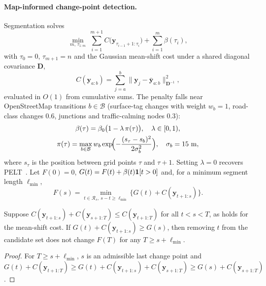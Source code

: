 \paragraph{Map-informed change-point detection.}
Segmentation solves
\begin{equation}
\min_{m,\,\tau_{1:m}}\ \sum_{i=1}^{m+1}C\bigl(\mathbf y_{\tau_{i-1}+1:\tau_i}\bigr)+\sum_{i=1}^{m}\beta(\tau_i),
\label{eq:pelt}
\end{equation}
with $\tau_0=0$, $\tau_{m+1}=n$ and the Gaussian mean-shift cost under a shared diagonal covariance $\mathbf D$,
\begin{equation}
C(\mathbf y_{a:b})=\sum_{j=a}^{b}\lVert\mathbf y_j-\bar{\mathbf y}_{a:b}\rVert^2_{\mathbf D^{-1}},
\end{equation}
evaluated in $O(1)$ from cumulative sums.
The penalty falls near OpenStreetMap transitions $b\in\mathcal B$ (surface-tag changes with weight $w_b=1$, road-class changes $0.6$, junctions and traffic-calming nodes $0.3$):
\begin{gather}
\beta(\tau)=\beta_0\bigl(1-\lambda\,\pi(\tau)\bigr),\quad \lambda\in[0,1),\\
\pi(\tau)=\max_{b\in\mathcal B}w_b\exp\!\Bigl(-\frac{(s_\tau-s_b)^2}{2\sigma_b^2}\Bigr),\quad \sigma_b=15~\mathrm m,
\end{gather}
where $s_\tau$ is the position between grid points $\tau$ and $\tau+1$.
Setting $\lambda=0$ recovers PELT~\cite{killick2012pelt}.
Let $F(0)=0$, $G(t)=F(t)+\beta(t)\mathbf{1}[t>0]$ and, for a minimum segment length $\ell_{\min}$,
\begin{equation}
F(s)=\min_{t\in\mathcal R_s,\ s-t\ge\ell_{\min}}\bigl\{G(t)+C(\mathbf y_{t+1:s})\bigr\}.
\end{equation}

\begin{lemma}
\label{lem:prune}
Suppose $C(\mathbf y_{t+1:s})+C(\mathbf y_{s+1:T})\le C(\mathbf y_{t+1:T})$ for all $t<s<T$, as holds for the mean-shift cost.
If $G(t)+C(\mathbf y_{t+1:s})\ge G(s)$, then removing $t$ from the candidate set does not change $F(T)$ for any $T\ge s+\ell_{\min}$.
\end{lemma}
\begin{proof}
For $T\ge s+\ell_{\min}$, $s$ is an admissible last change point and
$G(t)+C(\mathbf y_{t+1:T})\ge G(t)+C(\mathbf y_{t+1:s})+C(\mathbf y_{s+1:T})\ge G(s)+C(\mathbf y_{s+1:T})$.
\end{proof}

